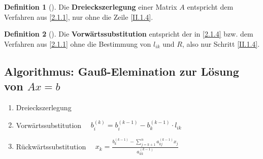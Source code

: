 \documentclass[ngerman,fontsize=11pt, paper=a4, parskip=half, titlepage=true, toc=bib]{scrbook}
\theoremstyle{definition}
\newtheorem{Def}{Definition}[section]		%
\theoremstyle{plain}
\newcommand{\subsectione}[1]{\addtocounter{Def}{1}\subsection{#1}}
\newenvironment{Defe}[1][]{ %
	\begin{Def}[#1]
	}
	{
	\end{Def}
	\addtocounter{subsection}{1}
}
\begin{document}
\begin{Defe}
	\label{2.1.5}
	Die \textbf{Dreieckszerlegung} einer Matrix $A$
	entspricht dem Verfahren aus \ref{2.1.1}, nur ohne die Zeile \eqref{II.1.4}.
\end{Defe}



\begin{Defe}
	Die \textbf{Vorwärtssubstitution} entspricht der in \ref{2.1.4}
	bzw. dem Verfahren aus \ref{2.1.1} 
	ohne die Bestimmung von $l_{ik}$ und $R$, also nur Schritt \eqref{II.1.4}.
\end{Defe}

\subsectione{Algorithmus: Gauß-Elemination zur Lösung von $Ax=b$}
\begin{framed}
  \begin{enumerate}[1]
  \item Dreieckszerlegung
  \item Vorwärtssubstitution        $\quad b_i^{(k)} = b_i^{(k-1)} -b_k^{(k-1)} \cdot   l_{ik} $
  \item Rückwärtssubstitution      $\quad x_k = \frac{b_k^{(k-1)}-\sum_{j=k+1}^{n}a_{kj}^{(k-1)}x_j}{a_{kk}^{(k-1)}}$
  \end{enumerate}
\end{framed}
\end{document}
